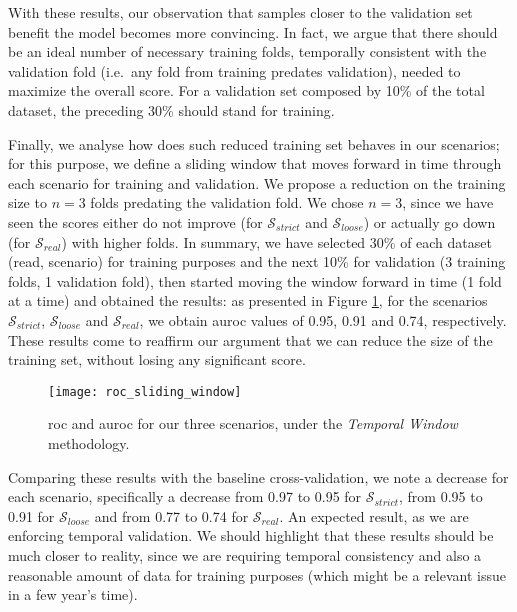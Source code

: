 
With these results, our observation that samples closer to the validation set benefit the model becomes more convincing. In fact, we argue that there should be an ideal number of necessary training folds, temporally consistent with the validation fold (i.e.\ any fold from training predates validation), needed to maximize the overall score. For a validation set composed by 10\% of the total dataset, the preceding 30\% should stand for training.

Finally, we analyse how does such reduced training set behaves in our scenarios; for this purpose, we define a sliding window that moves forward in time through each scenario for training and validation. We propose a reduction on the training size to $n=3$ folds predating the validation fold. We chose $n = 3$, since we have seen the scores either do not improve (for $\mathcal{S}_{strict}$ and $\mathcal{S}_{loose}$) or actually go down (for $\mathcal{S}_{real}$) with higher folds. In summary, we have selected 30\% of each dataset (read, scenario) for training purposes and the next 10\% for validation (3 training folds, 1 validation fold), then started moving the window forward in time (1 fold at a time) and obtained the results: as presented in Figure \ref{fig:roc_sliding_window}, for the scenarios $\mathcal{S}_{strict}$, $\mathcal{S}_{loose}$ and $\mathcal{S}_{real}$, we obtain \gls{auroc} values of 0.95, 0.91 and 0.74, respectively. These results come to reaffirm our argument that we can reduce the size of the training set, without losing any significant score.

\begin{figure}[!h]
	\centering
	\texttt{[image: roc\_sliding\_window]}
	\caption{\gls{roc} and \gls{auroc} for our three scenarios, under the \textit{Temporal Window} methodology.}
	\label{fig:roc_sliding_window}
\end{figure}

Comparing these results with the baseline cross-validation, we note a decrease for each scenario, specifically a decrease from 0.97 to 0.95 for $\mathcal{S}_{strict}$, from 0.95 to 0.91 for $\mathcal{S}_{loose}$ and from 0.77 to 0.74 for $\mathcal{S}_{real}$. An expected result, as we are enforcing temporal validation. We should highlight that these results should be much closer to reality, since we are requiring temporal consistency and also a reasonable amount of data for training purposes (which might be a relevant issue in a few year's time).

